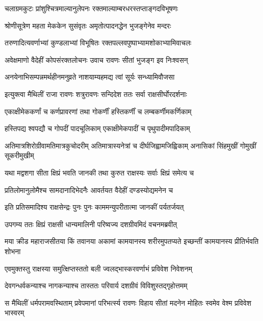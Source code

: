 \twolineshloka
{चलाग्रमकुटः प्रांशुश्चित्रमाल्यानुलेपनः}
{रक्तमाल्याम्बरधरस्तप्ताङ्गदविभूषणः} %

\twolineshloka
{श्रोणीसूत्रेण महता मेककेन सुसंवृतः}
{अमृतोत्पादनद्धेन भुजङ्गेनेव मन्दरः} %

\twolineshloka
{तरुणादित्यवर्णाभ्यां कुण्डलाभ्यां विभूषितः}
{रक्तपल्लवपुष्पाभ्यामशोकाभ्यामिवाचलः} %

\twolineshloka
{अवेक्षमाणो वैदेहीं कोपसंरक्तलोचनः}
{उवाच रावणः सीतां भुजङ्ग इव निःश्वसन्} %

\twolineshloka
{अनयेनाभिसम्पन्नमर्थहीनमनुव्रते}
{नाशयाम्यहमद्य त्वां सूर्यः सन्ध्यामिवौजसा} %

\twolineshloka
{इत्युक्त्वा मैथिलीं राजा रावणः शत्रुरावणः}
{सन्दिदेश ततः सर्वा राक्षसीर्घोरदर्शनाः} %

\twolineshloka
{एकाक्षीमेककर्णां च कर्णप्रावरणां तथा}
{गोकर्णीं हस्तिकर्णीं च लम्बकर्णीमकर्णिकाम्} %

\twolineshloka
{हस्तिपद्य श्वपद्यौ च गोपदीं पादचूलिकाम्}
{एकाक्षीमेकपादीं च पृथुपादीमपादिकाम्} %

\threelineshloka
{अतिमात्रशिरोग्रीवामतिमात्रकुचोदरीम्}
{अतिमात्रास्यनेत्रां च दीर्घजिह्वामजिह्विकाम्}
{अनासिकां सिंहमुखीं गोमुखीं सूकरीमुखीम्} %

\twolineshloka
{यथा मद्वशगा सीता क्षिप्रं भवति जानकी}
{तथा कुरुत राक्षस्यः सर्वाः क्षिप्रं समेत्य च} %

\twolineshloka
{प्रतिलोमानुलोमैश्च सामदानादिभेदनैः}
{आवर्तयत वैदेहीं दण्डस्योद्यमनेन च} %

\twolineshloka
{इति प्रतिसमादिश्य राक्षसेन्द्रः पुनः पुनः}
{काममन्युपरीतात्मा जानकीं पर्यतर्जयत्} %

\twolineshloka
{उपगम्य ततः क्षिप्रं राक्षसी धान्यमालिनी}
{परिष्वज्य दशग्रीवमिदं वचनमब्रवीत्} %

\threelineshloka
{मया क्रीड महाराजसीतया किं तवानया}
{अकामां कामयानस्य शरीरमुपतप्यते}
{इच्छन्तीं कामयानस्य प्रीतिर्भवति शोभना} %

\twolineshloka
{एवमुक्तस्तु राक्षस्या समुत्क्षिप्तस्ततो बली}
{ज्वलद्भास्करवर्णाभं प्रविवेश निवेशनम्} %

\twolineshloka
{देवगन्धर्वकन्याश्च नागकन्याश्च तास्ततः}
{परिवार्य दशग्रीवं विविशुस्तद्गृहोत्तमम्} %

\fourlineindentedshloka
{स मैथिलीं धर्मपरामवस्थिताम्}
{प्रवेपमानां परिभर्त्स्य रावणः}
{विहाय सीतां मदनेन मोहितः}
{स्वमेव वेश्म प्रविवेश भास्वरम्} %


